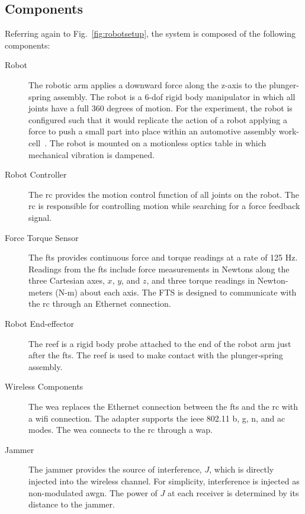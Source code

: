 \subsection{Components}

Referring again to Fig.~\ref{fig:robotsetup}, the system is composed of the following components:

\begin{description}
	\item[Robot] The robotic arm applies a downward force along the z-axis to the plunger-spring assembly.  The robot is a 6-\gls{dof} rigid body manipulator in which all joints have a full 360 degrees of motion.  For the experiment, the robot is configured such that it would replicate the action of a robot applying a force to push a small part into place within an automotive assembly work-cell~\cite{Cossio2012.RoboticsHandbook}.  The robot is mounted on a motionless optics table in which mechanical vibration is dampened.
	
	\item[Robot Controller] The \gls{rc} provides the motion control function of all joints on the robot.  The \gls{rc} is responsible for controlling motion while searching for a force feedback signal.
	
	\item[Force Torque Sensor] The \gls{fts} provides continuous force and torque readings at a rate of 125 Hz.  Readings from the \gls{fts} include force measurements in Newtons along the three Cartesian axes, $x$, $y$, and $z$, and three torque readings in Newton-meters (N-m) about each axis.  The FTS is designed to communicate with the \gls{rc} through an Ethernet connection. 
	
	\item[Robot End-effector] The \gls{reef} is a rigid body probe attached to the end of the robot arm just after the \gls{fts}.  The \gls{reef} is used to make contact with the plunger-spring assembly.   
	
	\item[Wireless Components]  The \gls{wea} replaces the Ethernet connection between the \gls{fts} and the \gls{rc} with a \gls{wifi} connection.  The adapter supports the \gls{ieee} 802.11 b, g, n, and ac modes. The \gls{wea} connects to the \gls{rc} through a \gls{wap}.
	
	\item[Jammer] The jammer provides the source of interference, $J$, which is directly injected into the wireless channel.  For simplicity, interference is injected as non-modulated \gls{awgn}.  The power of $J$ at each receiver is determined by its distance to the jammer.
	

\end{description}
